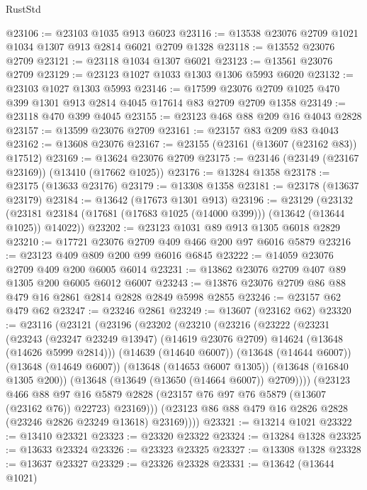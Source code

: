 \begin{lexlean}{RustStd}
\begin{coremodule}
@23106 := @23103 @1035 @913 @6023
@23116 := @13538 @23076 @2709 @1021 @1034 @1307 @913 @2814 @6021 @2709 @1328
@23118 := @13552 @23076 @2709
@23121 := @23118 @1034 @1307 @6021
@23123 := @13561 @23076 @2709
@23129 := @23123 @1027 @1033 @1303 @1306 @5993 @6020
@23132 := @23103 @1027 @1303 @5993
@23146 := @17599 @23076 @2709 @1025 @470 @399 @1301 @913 @2814 @4045 @17614 @83 @2709 @2709 @1358
@23149 := @23118 @470 @399 @4045
@23155 := @23123 @468 @88 @209 @16 @4043 @2828
@23157 := @13599 @23076 @2709
@23161 := @23157 @83 @209 @83 @4043
@23162 := @13608 @23076
@23167 := @23155 (@23161 (@13607 (@23162 @83)) @17512)
@23169 := @13624 @23076 @2709
@23175 := @23146 (@23149 (@23167 @23169)) (@13410 (@17662 @1025))
@23176 := @13284 @1358
@23178 := @23175 (@13633 @23176)
@23179 := @13308 @1358
@23181 := @23178 (@13637 @23179)
@23184 := @13642 (@17673 @1301 @913)
@23196 := @23129
    (@23132 (@23181 @23184 (@17681 (@17683 @1025 (@14000 @399))) (@13642 (@13644 @1025)) @14022))
@23202 := @23123 @1031 @89 @913 @1305 @6018 @2829
@23210 := @17721 @23076 @2709 @409 @466 @200 @97 @6016 @5879
@23216 := @23123 @409 @809 @200 @99 @6016 @6845
@23222 := @14059 @23076 @2709 @409 @200 @6005 @6014
@23231 := @13862 @23076 @2709 @407 @89 @1305 @200 @6005 @6012 @6007
@23243 := @13876 @23076 @2709 @86 @88 @479 @16 @2861 @2814 @2828 @2849 @5998 @2855
@23246 := @23157 @62 @479 @62
@23247 := @23246 @2861
@23249 := @13607 (@23162 @62)
@23320 := @23116
    (@23121
      (@23196
        (@23202
          (@23210
            (@23216
              (@23222
                (@23231
                  (@23243
                    (@23247 @23249 @13947)
                    (@14619 @23076 @2709)
                    @14624
                    (@13648 (@14626 @5999 @2814)))
                  (@14639 (@14640 @6007))
                  (@13648 (@14644 @6007))
                  (@13648 (@14649 @6007))
                  (@13648 (@14653 @6007 @1305))
                  (@13648 (@16840 @1305 @200))
                  (@13648 (@13649 (@13650 (@14664 @6007)) @2709))))
              (@23123
                @466
                @88
                @97
                @16
                @5879
                @2828
                (@23157 @76 @97 @76 @5879 (@13607 (@23162 @76)) @22723)
                @23169)))
          (@23123 @86 @88 @479 @16 @2826 @2828 (@23246 @2826 @23249 @13618) @23169))))
@23321 := @13214 @1021
@23322 := @13410 @23321
@23323 := @23320 @23322
@23324 := @13284 @1328
@23325 := @13633 @23324
@23326 := @23323 @23325
@23327 := @13308 @1328
@23328 := @13637 @23327
@23329 := @23326 @23328
@23331 := @13642 (@13644 @1021)

\end{coremodule}
\end{lexlean}
